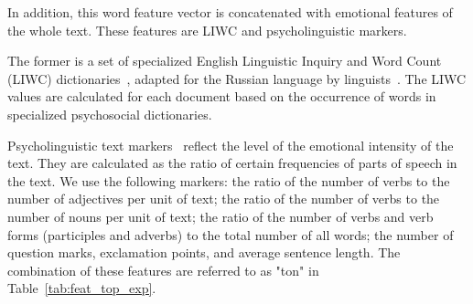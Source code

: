 \documentclass[a4paper,fleqn,longmktitle]{cas-dc}
\begin{document}
In addition, this word feature vector is concatenated with emotional features of the whole text. These features are LIWC and psycholinguistic markers.

The former is a set of specialized English Linguistic Inquiry and Word Count (LIWC) dictionaries~\cite{tausczik2010psychological}, adapted for the Russian language by linguists~\cite{litvinova2017deception}. The LIWC values are calculated for each document based on the occurrence of words in specialized psychosocial dictionaries. 

Psycholinguistic text markers~\cite{sboev2015quantitative} reflect the level of the emotional intensity of the text. They are calculated as the ratio of certain frequencies of parts of speech in the text. We use the following markers: the ratio of the number of verbs to the number of adjectives per unit of text; the ratio of the number of verbs to the number of nouns per unit of text; the ratio of the number of verbs and verb forms (participles and adverbs) to the total number of all words; the number of question marks, exclamation points, and average sentence length. The combination of these features are referred to as "ton" in Table~\ref{tab:feat_top_exp}.
\end{document}

